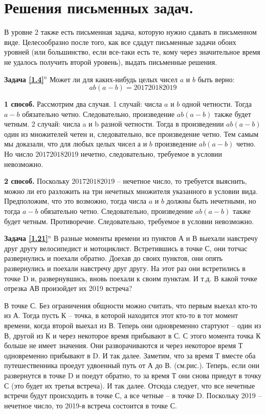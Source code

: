
\section{Решения письменных задач.}

В уровне 2 также есть письменная задача, которую нужно сдавать в письменном виде. Целесообразно после того, как все сдадут письменные задачи обоих уровней (или большинство, если все-таки  есть те, кому через значительное время не удалось получить второй уровень), выдать письменные решения. 



\textbf{Задача \ref{1.4}}$^n$ Может ли для каких-нибудь целых чисел $a$ и $b$ быть верно:    $$ab(a-b) = 201720182019$$

\begin{prf}
	\textbf{1 способ.} Рассмотрим два случая. 1 случай: числа $a$ и $b$ одной четности. Тогда $a - b$ обязательно четно. Следовательно, произведение $ab(a-b)$ также будет четным. 2 случай: числа a и b разной четности. Тогда в произведении $ab(a-b)$ один из множителей четен и, следовательно, все произведение четно. Тем самым мы доказали, что для любых целых чисел $ а $ и $ b $ произведение $ab(a-b)$ четно. Но число $ 201720182019 $ нечетно, следовательно, требуемое в условии невозможно.
	
	\textbf{2 способ.} Поскольку $ 201720182019 $ -- нечетное число, то требуется выяснить, можно ли его разложить на три нечетных множителя указанного в условии вида. Предположим, что это возможно, тогда числа $a$ и $b$ должны быть нечетными, но тогда $a - b$ обязательно четно. Следовательно, произведение $ab(a-b)$ также будет четным. Противоречие. Следовательно, требуемое в условии невозможно.
\end{prf}

\textbf{Задача \ref{1.21}}$^n$
	В разные моменты времени из пунктов А и В выехали навстречу друг другу велосипедист и мотоциклист. Встретившись в точке С, они тотчас развернулись и поехали обратно. Доехав до своих пунктов, они опять развернулись и поехали навстречу друг другу. На этот раз они встретились в точке D и, развернувшись, вновь поехали к своим пунктам. И т.д. В какой точке отрезка АВ произойдет их 2019 встреча?

\begin{prf}
	В точке С. 
	Без ограничения общности можно считать, что первым выехал кто-то из А. Тогда пусть К – точка, в которой находится этот кто-то в тот момент времени, когда второй выехал из В. Теперь они одновременно стартуют – один из В, другой из К и через некоторое время прибывают в С. С этого момента точка К больше не имеет значения. Они разворачиваются и через некоторое время Т одновременно прибывают в D. И так далее. Заметим, что за время Т вместе оба путешественника проедут удвоенный путь от А до В. (см.рис.). Теперь, если они развернутся в точке D и поедут обратно, то за время Т они снова приедут в точку С (это будет их третья встреча). И так далее. Отсюда следует, что все нечетные встречи будут происходить в точке С, а все четные – в точке D. Поскольку 2019 – нечетное число, то 2019-я встреча состоится в точке С.
\end{prf}

